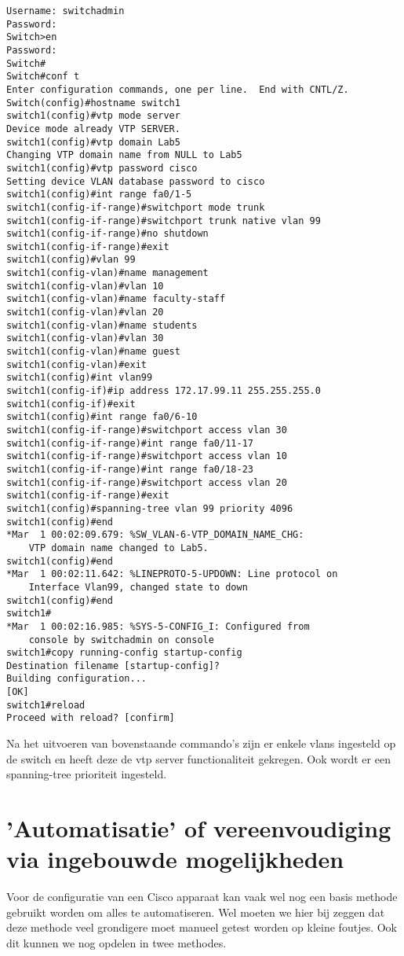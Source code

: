 \begin{center}
\begin{Verbatim}
Username: switchadmin
Password: 
Switch>en
Password: 
Switch#
Switch#conf t
Enter configuration commands, one per line.  End with CNTL/Z.
Switch(config)#hostname switch1
switch1(config)#vtp mode server
Device mode already VTP SERVER.
switch1(config)#vtp domain Lab5
Changing VTP domain name from NULL to Lab5
switch1(config)#vtp password cisco
Setting device VLAN database password to cisco
switch1(config)#int range fa0/1-5
switch1(config-if-range)#switchport mode trunk
switch1(config-if-range)#switchport trunk native vlan 99
switch1(config-if-range)#no shutdown
switch1(config-if-range)#exit
switch1(config)#vlan 99
switch1(config-vlan)#name management
switch1(config-vlan)#vlan 10
switch1(config-vlan)#name faculty-staff
switch1(config-vlan)#vlan 20
switch1(config-vlan)#name students
switch1(config-vlan)#vlan 30
switch1(config-vlan)#name guest
switch1(config-vlan)#exit
switch1(config)#int vlan99
switch1(config-if)#ip address 172.17.99.11 255.255.255.0
switch1(config-if)#exit
switch1(config)#int range fa0/6-10
switch1(config-if-range)#switchport access vlan 30
switch1(config-if-range)#int range fa0/11-17
switch1(config-if-range)#switchport access vlan 10
switch1(config-if-range)#int range fa0/18-23
switch1(config-if-range)#switchport access vlan 20
switch1(config-if-range)#exit
switch1(config)#spanning-tree vlan 99 priority 4096
switch1(config)#end
*Mar  1 00:02:09.679: %SW_VLAN-6-VTP_DOMAIN_NAME_CHG: 
    VTP domain name changed to Lab5.
switch1(config)#end
*Mar  1 00:02:11.642: %LINEPROTO-5-UPDOWN: Line protocol on 
    Interface Vlan99, changed state to down
switch1(config)#end
switch1#
*Mar  1 00:02:16.985: %SYS-5-CONFIG_I: Configured from 
    console by switchadmin on console
switch1#copy running-config startup-config
Destination filename [startup-config]? 
Building configuration...
[OK]
switch1#reload
Proceed with reload? [confirm]
\end{Verbatim}
\end{center}

Na het uitvoeren van bovenstaande commando's zijn er enkele vlans ingesteld op de switch en heeft deze de vtp server functionaliteit gekregen. Ook wordt er een spanning-tree prioriteit ingesteld.


\section{'Automatisatie' of vereenvoudiging via ingebouwde mogelijkheden}
\label{sec:ingebouwde mogelijkheden}
Voor de configuratie van een Cisco apparaat kan vaak wel nog een basis methode gebruikt worden om alles te automatiseren. Wel moeten we hier bij zeggen dat deze methode veel grondigere moet manueel getest worden op kleine foutjes. Ook dit kunnen we nog opdelen in twee methodes. 

